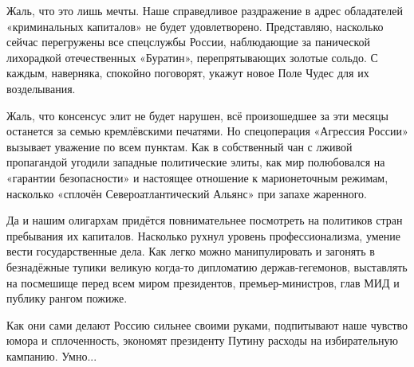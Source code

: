 Жаль, что это лишь мечты. Наше справедливое раздражение в адрес обладателей
«криминальных капиталов» не будет удовлетворено. Представляю, насколько сейчас
перегружены все спецслужбы России, наблюдающие за панической лихорадкой
отечественных «Буратин», перепрятывающих золотые сольдо. С каждым, наверняка,
спокойно поговорят, укажут новое Поле Чудес для их возделывания.

Жаль, что консенсус элит не будет нарушен, всё произошедшее за эти месяцы
останется за семью кремлёвскими печатями. Но спецоперация «Агрессия России»
вызывает уважение по всем пунктам. Как в собственный чан с лживой пропагандой
угодили западные политические элиты, как мир полюбовался на «гарантии
безопасности» и настоящее отношение к марионеточным режимам, насколько «сплочён
Североатлантический Альянс» при запахе жаренного.

Да и нашим олигархам придётся повнимательнее посмотреть на политиков стран
пребывания их капиталов. Насколько рухнул уровень профессионализма, умение
вести государственные дела. Как легко можно манипулировать и загонять в
безнадёжные тупики великую когда-то дипломатию держав-гегемонов, выставлять на
посмешище перед всем миром президентов, премьер-министров, глав МИД и публику
рангом пожиже.

Как они сами делают Россию сильнее своими руками, подпитывают наше чувство
юмора и сплоченность, экономят президенту Путину расходы на избирательную
кампанию. Умно...
